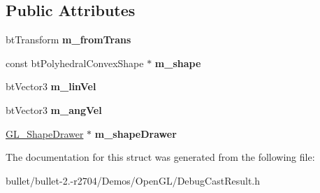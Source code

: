 \subsection*{Public Attributes}
\begin{DoxyCompactItemize}
\item 
\hypertarget{structbt_debug_cast_result_accb73d800be44f4f46b2dcff304d2e39}{bt\+Transform {\bfseries m\+\_\+from\+Trans}}\label{structbt_debug_cast_result_accb73d800be44f4f46b2dcff304d2e39}

\item 
\hypertarget{structbt_debug_cast_result_addad7212b15454fa199521d8c2e13f34}{const bt\+Polyhedral\+Convex\+Shape $\ast$ {\bfseries m\+\_\+shape}}\label{structbt_debug_cast_result_addad7212b15454fa199521d8c2e13f34}

\item 
\hypertarget{structbt_debug_cast_result_aa45706d428e5b4dc4080f9ac83fdadb0}{bt\+Vector3 {\bfseries m\+\_\+lin\+Vel}}\label{structbt_debug_cast_result_aa45706d428e5b4dc4080f9ac83fdadb0}

\item 
\hypertarget{structbt_debug_cast_result_ac6c39da27e958a1880317010bd788aff}{bt\+Vector3 {\bfseries m\+\_\+ang\+Vel}}\label{structbt_debug_cast_result_ac6c39da27e958a1880317010bd788aff}

\item 
\hypertarget{structbt_debug_cast_result_a643a535b991d95ce5d60c43e872e6a27}{\hyperlink{class_g_l___shape_drawer}{G\+L\+\_\+\+Shape\+Drawer} $\ast$ {\bfseries m\+\_\+shape\+Drawer}}\label{structbt_debug_cast_result_a643a535b991d95ce5d60c43e872e6a27}

\end{DoxyCompactItemize}


The documentation for this struct was generated from the following file\+:\begin{DoxyCompactItemize}
\item 
bullet/bullet-\/2.-\/r2704/\+Demos/\+Open\+G\+L/Debug\+Cast\+Result.\+h\end{DoxyCompactItemize}
